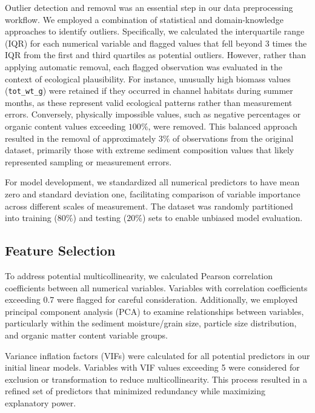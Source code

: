 \documentclass[12pt]{article}
\begin{document}
\qquad Outlier detection and removal was an essential step in our data preprocessing workflow. We employed a combination of statistical and domain-knowledge approaches to identify outliers. Specifically, we calculated the interquartile range (IQR) for each numerical variable and flagged values that fell beyond 3 times the IQR from the first and third quartiles as potential outliers. However, rather than applying automatic removal, each flagged observation was evaluated in the context of ecological plausibility. For instance, unusually high biomass values (\texttt{tot\_wt\_g}) were retained if they occurred in channel habitats during summer months, as these represent valid ecological patterns rather than measurement errors. Conversely, physically impossible values, such as negative percentages or organic content values exceeding $100\%$, were removed. This balanced approach resulted in the removal of approximately $3\%$ of observations from the original dataset, primarily those with extreme sediment composition values that likely represented sampling or measurement errors.

\qquad For model development, we standardized all numerical predictors to have mean zero and standard deviation one, facilitating comparison of variable importance across different scales of measurement. The dataset was randomly partitioned into training ($80\%$) and testing ($20\%$) sets to enable unbiased model evaluation.


\subsection{Feature Selection}

\qquad To address potential multicollinearity, we calculated Pearson correlation coefficients between all numerical variables. Variables with correlation coefficients exceeding 0.7 were flagged for careful consideration. Additionally, we employed principal component analysis (PCA) to examine relationships between variables, particularly within the sediment moisture/grain size, particle size distribution, and organic matter content variable groups.

\qquad Variance inflation factors (VIFs) were calculated for all potential predictors in our initial linear models. Variables with VIF values exceeding 5 were considered for exclusion or transformation to reduce multicollinearity. This process resulted in a refined set of predictors that minimized redundancy while maximizing explanatory power.
\end{document}
